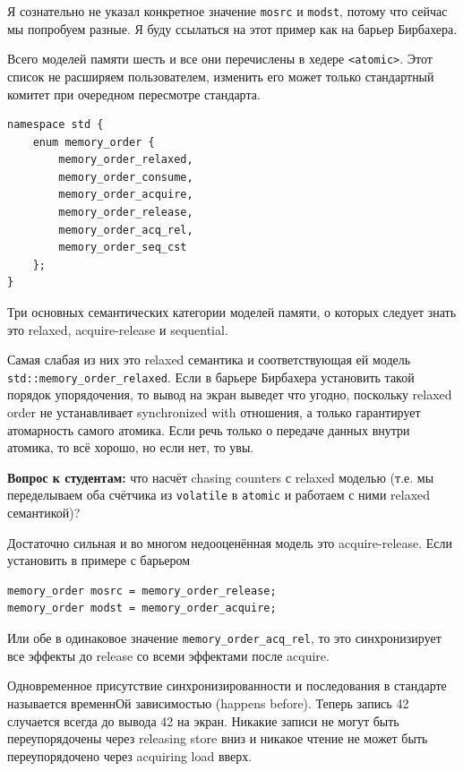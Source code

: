 \documentclass[a4paper,12pt,oneside]{book}
\newif\ifanswers
\begin{document}
Я сознательно не указал конкретное значение \lstinline!mosrc! и \lstinline!modst!, потому что сейчас мы попробуем разные. Я буду ссылаться на этот пример как на барьер Бирбахера.

Всего моделей памяти шесть и все они перечислены в хедере \lstinline!<atomic>!. Этот список не расширяем пользователем, изменить его может только стандартный комитет при очередном пересмотре стандарта.

\begin{lstlisting}
namespace std {
	enum memory_order {
		memory_order_relaxed,
		memory_order_consume,
		memory_order_acquire,
		memory_order_release,
		memory_order_acq_rel,
		memory_order_seq_cst
	};
}
\end{lstlisting}

Три основных семантических категории моделей памяти, о которых следует знать это relaxed, acquire-release и sequential.

Самая слабая из них это relaxed семантика и соответствующая ей модель \lstinline!std::memory_order_relaxed!. Если в барьере Бирбахера установить такой порядок упорядочения, то вывод на экран выведет что угодно, поскольку relaxed order не устанавливает synchronized with отношения, а только гарантирует атомарность самого атомика. Если речь только о передаче данных внутри атомика, то всё хорошо, но если нет, то увы.

\textbf{Вопрос к студентам:} что насчёт chasing counters с relaxed моделью (т.е. мы переделываем оба счётчика из \lstinline!volatile! в \lstinline!atomic! и работаем с ними relaxed семантикой)?

\ifanswers
Правильный ответ: в chasing counters с этой моделью всё будет хорошо, потому что там заворачивается в атомик сам счётчик
\fi

Достаточно сильная и во многом недооценённая модель это acquire-release. Если установить в примере с барьером 

\begin{lstlisting}
memory_order mosrc = memory_order_release;
memory_order modst = memory_order_acquire;
\end{lstlisting}

Или обе в одинаковое значение \lstinline!memory_order_acq_rel!, то это синхронизирует все эффекты до release со всеми эффектами после acquire.

Одновременное присутствие синхронизированности и последования в стандарте называется временнОй зависимостью (happens before). Теперь запись 42 случается всегда до вывода 42 на экран. Никакие записи не могут быть переупорядочены через releasing store вниз и никакое чтение не может быть переупорядочено через acquiring load вверх.
\end{document}
